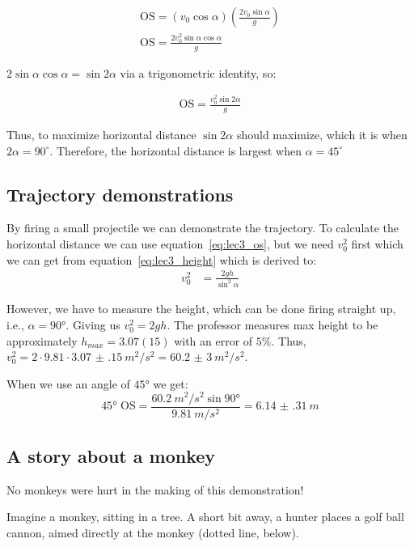 \begin{align}
\text{OS} = (v_0 \cos \alpha) \left(\frac{2 v_0 \sin \alpha}{g} \right)\\
\text{OS} = \frac{2 v_0^2 \sin \alpha \cos \alpha}{g}
\end{align}

$2 \sin \alpha \cos \alpha = \sin 2 \alpha$ via a trigonometric identity, so:

\begin{align}
\text{OS} = \frac{v_0^2 \sin 2\alpha}{g} \label{eq:lec3_os}
\end{align}

Thus, to maximize horizontal distance $\sin{2\alpha}$ should maximize, which it is when $2\alpha=90^{\circ}$.
Therefore, the horizontal distance is largest when $\alpha=45^{\circ}$


\subsection{Trajectory demonstrations}

By firing a small projectile we can demonstrate the trajectory. 
To calculate the horizontal distance we can use equation~\ref{eq:lec3_os},
but we need $v_0^2$ first which we can get from equation~\ref{eq:lec3_height}
which is derived to:
\begin{eqnarray*}
  v_0^2 &= \frac{2gh}{\sin^2 \alpha}
\end{eqnarray*}

However, we have to measure the height, which can be done firing straight up, i.e., $\alpha = \ang{90}$.
Giving us $v_0^2=2gh$. The professor measures max height to be approximately $h_{max}=3.07(15)$ with an error of $5\%$.
Thus, $v_0^2 = 2\cdot9.81\cdot\SI{3.07(15)}{m^2/s^2} =  \SI{60.2(30)}{m^2/s^2}$.

When we use an angle of $\ang{45}$ we get:
\begin{equation}
\ang{45}\text{ OS} = \frac{\SI{60.2}{m^2/s^2} \sin \ang{90}}{\SI{9.81}{m/s^2}} = \SI{6.14(31)}{m}
\end{equation}


\subsection{A story about a monkey}

No monkeys were hurt in the making of this demonstration!

Imagine a monkey, sitting in a tree. A short bit away, a hunter places a golf ball cannon, aimed directly at the monkey (dotted line, below).

